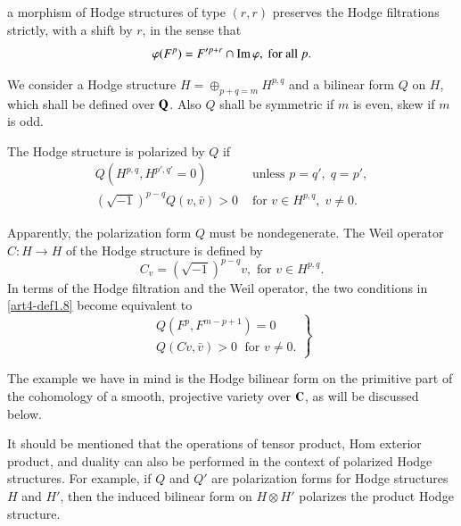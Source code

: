 a morphism of Hodge structures of type $(r,r)$ preserves the Hodge filtrations strictly, with a shift by $r$, in the sense that 
\begin{equation}
\varphi(F^p) = F'^{p+r} \cap \operatorname{Im} \varphi, \text{ for all } p. 
\label{art4-eq1.7}
\end{equation}

We consider a Hodge structure $H = \oplus_{p+q = m} H^{p,q}$ and a bilinear form $Q$ on $H$, which shall be defined over $\mathbf{Q}$. Also $Q$ shall be symmetric if $m$ is even, skew if $m$ is odd.

\setcounter{definition}{7}
\begin{definition}\label{art4-def1.8}
The Hodge structure is polarized by $Q$ if 
$$
\begin{matrix}
Q (H^{p,q} , H^{p', q'} =0) & \text{ unless } p = q', \; q = p',\\[2pt]
(\sqrt{-1})^{p-q} Q (v, \bar{v}) > 0 & \text{ for } v \in H^{p,q}, \; v \neq 0.
\end{matrix}
$$
\end{definition}

Apparently, the polarization form $Q$ must be nondegenerate. The Weil operator $C: H \to H$ of the Hodge structure is defined by 
\setcounter{equation}{8}
\begin{equation}
C_v = (\sqrt{-1})^{p-q} v, \text{ for } v \in H^{p,q} . \label{art4-eq1.9}
\end{equation}
In terms of the Hodge filtration and the Weil operator, the two conditions in \ref{art4-def1.8} become equivalent to 
\begin{equation}
\left.
\begin{matrix}
Q (F^p, F^{m-p+1}) = 0\\
Q (C v, \bar{v}) >0 \;\text{  for } v \neq 0.
\end{matrix}\right\}
\label{art4-eq1.10}
\end{equation}

The example we have in mind is the Hodge bilinear form on the primitive part of the cohomology of a smooth, projective variety over $\mathbf{C}$, as will be discussed below.

It should be mentioned that the operations of tensor product, Hom exterior product, and duality can also be performed in the context of polarized Hodge structures. For example, if $Q$ and $Q'$ are polarization forms for Hodge structures $H$ and $H'$, then the induced bilinear form on $H \otimes H'$ polarizes the product Hodge structure.

